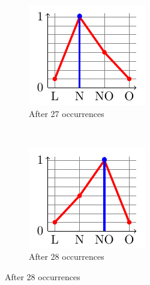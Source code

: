 \begin{figure}
\begin{subfigure}[t]{.15\linewidth}
\includegraphics[width=\linewidth]{plot_tikz/speed27.pdf}
\caption{After 27 occurrences}
\label{fig:g}
\end{subfigure}
\\
\vspace{0.5cm}
\begin{subfigure}[b]{.15\linewidth}
\includegraphics[width=\linewidth]{plot_tikz/speed28.pdf}
\caption{After 28 occurrences}
\label{fig:h}
\end{subfigure}

\end{figure}

